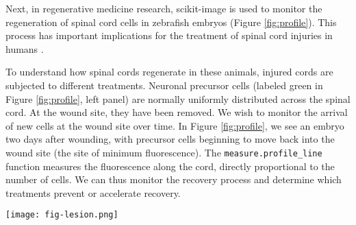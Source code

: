     Next, in regenerative medicine research, scikit-image is used to monitor the regeneration of spinal cord cells in zebrafish embryos (Figure \ref{fig:profile}). This process has important implications for the treatment of spinal cord injuries in humans \citep{Bhatt04,Thuret06}.

    To understand how spinal cords regenerate in these animals, injured cords are subjected to different treatments. Neuronal precursor cells (labeled green in Figure \ref{fig:profile}, left panel) are normally uniformly distributed across the spinal cord. At the wound site, they have been removed. We wish to monitor the arrival of new cells at the wound site over time. In Figure \ref{fig:profile}, we see an embryo two days after wounding, with precursor cells beginning to move back into the wound site (the site of minimum fluorescence). The \texttt{measure.profile\_line} function measures the fluorescence along the cord, directly proportional to the number of cells. We can thus monitor the recovery process and determine which treatments prevent or accelerate recovery.

    \begin{figure*}[bht]

      \texttt{[image: fig-lesion.png]}

      \caption{The \texttt{measure.profile\_line} function being used to track recovery in spinal cord injuries. (a): an image of fluorescently-labeled nerve cells in an injured zebrafish embryo. (b): the automatically determined region of interest. The SciPy library was used to determine the region extent \citep{scipy,scipylib}, and functions from the scikit-image \texttt{draw} module were used to draw it. (c): the image intensity along the line of interest, averaged over the displayed width. \label{fig:profile}}
    \end{figure*}
